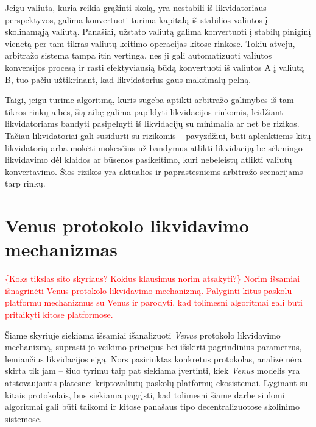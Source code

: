 \documentclass[]{VUMIFTemplateClass}
\begin{document}
Jeigu valiuta, kuria reikia grąžinti skolą, yra nestabili iš likvidatoriaus perspektyvos, galima konvertuoti turima kapitalą iš stabilios valiutos į skolinamąją valiutą. Panašiai, užstato valiutą galima konvertuoti į stabilų piniginį vienetą per tam tikras valiutų keitimo operacijas kitose rinkose. Tokiu atveju, arbitražo sistema tampa itin vertinga, nes ji gali automatizuoti valiutos konversijos procesą ir rasti efektyviausią būdą konvertuoti iš valiutos A į valiutą B, tuo pačiu užtikrinant, kad likvidatorius gaus maksimalų pelną.

Taigi, jeigu turime algoritmą, kuris sugeba aptikti arbitražo galimybes iš tam tikros rinkų aibės, šią aibę galima papildyti likvidacijos rinkomis, leidžiant likvidatoriams bandyti pasipelnyti iš likvidacijų su minimalia ar net be rizikos. Tačiau likvidatoriai gali susidurti su rizikomis -- pavyzdžiui, būti aplenktiems kitų likvidatorių arba mokėti mokesčius už bandymus atlikti likvidaciją be sėkmingo likvidavimo dėl klaidos ar būsenos pasikeitimo, kuri nebeleistų atlikti valiutų konvertavimo. Šios rizikos yra aktualios ir paprastesniems arbitražo scenarijams tarp rinkų.

\section{Venus protokolo likvidavimo mechanizmas}
\label{sec:venus_mechanizmas}

\textcolor{red}{
\{Koks tikslas sito skyriaus? Kokius klausimus norim atsakyti?\}
Norim išsamiai išnagrinėti Venus protokolo likvidavimo mechanizmą.
Palyginti kitus paskolu platformu mechanizmus su Venus ir parodyti, kad tolimesni algoritmai gali buti pritaikyti kitose platformose.
}

Šiame skyriuje siekiama išsamiai išanalizuoti \textit{Venus} protokolo likvidavimo mechanizmą, suprasti jo veikimo principus bei išskirti pagrindinius parametrus, lemiančius likvidacijos eigą. Nors pasirinktas konkretus protokolas, analizė nėra skirta tik jam – šiuo tyrimu taip pat siekiama įvertinti, kiek \textit{Venus} modelis yra atstovaujantis platesnei kriptovaliutų paskolų platformų ekosistemai. Lyginant su kitais protokolais, bus siekiama pagrįsti, kad tolimesni šiame darbe siūlomi algoritmai gali būti taikomi ir kitose panašaus tipo decentralizuotose skolinimo sistemose.
\end{document}
